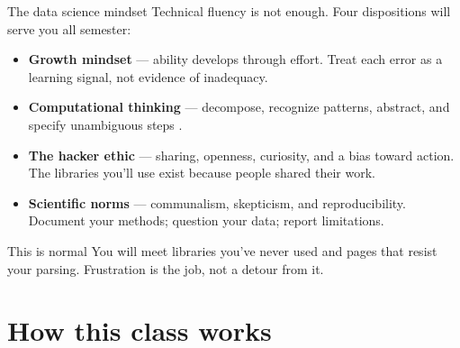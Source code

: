 \documentclass[9pt,aspectratio=169]{beamer}
\begin{document}
\begin{frame}{The data science mindset}
    Technical fluency is not enough. Four dispositions will serve you all semester:
    \begin{itemize}
        \item \textcolor{tab-green}{\textbf{Growth mindset}} --- ability develops through effort. Treat each error as a learning signal, not evidence of inadequacy.
        \item \textcolor{tab-blue}{\textbf{Computational thinking}} --- decompose, recognize patterns, abstract, and specify unambiguous steps \parencite{wing2006computational}.
        \item \textcolor{tab-orange}{\textbf{The hacker ethic}} --- sharing, openness, curiosity, and a bias toward action. The libraries you'll use exist because people shared their work.
        \item \textcolor{tab-purple}{\textbf{Scientific norms}} --- communalism, skepticism, and reproducibility. Document your methods; question your data; report limitations.
    \end{itemize}
    \vspace{0.5em}
    \begin{alertblock}{This is normal}
        \footnotesize You will meet libraries you've never used and pages that resist your parsing. Frustration is the job, not a detour from it.
    \end{alertblock}
\end{frame}

\section{How this class works}
\end{document}
